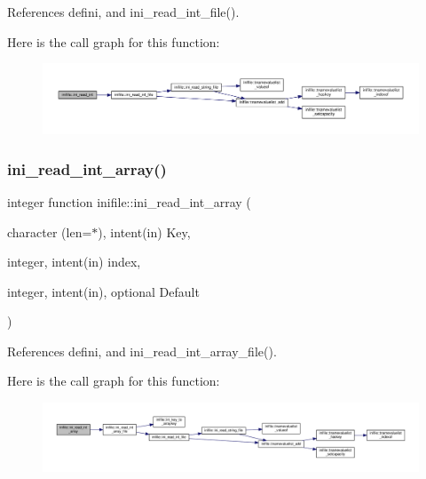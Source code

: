 References defini, and ini\+\_\+read\+\_\+int\+\_\+file().

Here is the call graph for this function\+:
\nopagebreak
\begin{figure}[H]
\begin{center}
\leavevmode
\includegraphics[width=350pt]{namespaceinifile_a9e879031e39e829173144313b77f5ca7_cgraph}
\end{center}
\end{figure}
\mbox{\label{namespaceinifile_adc8c25cb1df4d91c2d6a7c06dbd55f25}} 
\subsubsection{\texorpdfstring{ini\+\_\+read\+\_\+int\+\_\+array()}{ini\_read\_int\_array()}}
{\footnotesize\ttfamily integer function inifile\+::ini\+\_\+read\+\_\+int\+\_\+array (\begin{DoxyParamCaption}\item[{character (len=$\ast$), intent(in)}]{Key,  }\item[{integer, intent(in)}]{index,  }\item[{integer, intent(in), optional}]{Default }\end{DoxyParamCaption})}



References defini, and ini\+\_\+read\+\_\+int\+\_\+array\+\_\+file().

Here is the call graph for this function\+:
\nopagebreak
\begin{figure}[H]
\begin{center}
\leavevmode
\includegraphics[width=350pt]{namespaceinifile_adc8c25cb1df4d91c2d6a7c06dbd55f25_cgraph}
\end{center}
\end{figure}
\mbox{\label{namespaceinifile_a327aeaeeb0b796b9b97cdae69147b0d6}} 
